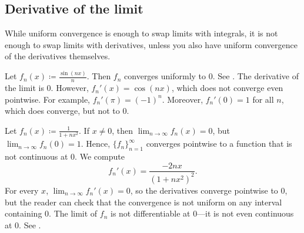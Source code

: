 \subsection{Derivative of the limit}

While uniform convergence is enough to swap limits with integrals, it is not
enough to swap limits with derivatives, unless you also have
uniform convergence of the derivatives themselves.

\begin{example}
Let $f_n(x) \coloneqq \frac{\sin(nx)}{n}$.  Then $f_n$ converges uniformly to
0.  See .
The derivative of the limit is 0.  However, $f_n'(x) = \cos(nx)$, which
does not converge even pointwise.
For example, $f_n'(\pi) = {(-1)}^n$.
Moreover, $f_n'(0) = 1$ for all $n$, which does converge, but not to $0$.
\begin{myfigureht}
\caption{Graphs of $\frac{\sin(nx)}{n}$ for
$n=1,2,\ldots,10$, with higher $n$ in fainter gray.%
\label{fig:conv1nsinxn}}
\end{myfigureht}
\end{example}

\begin{example} \label{exercise:badconvergenceder}
Let $f_n(x) \coloneqq \frac{1}{1+nx^2}$.
If $x \neq 0$, then $\lim_{n \to \infty} f_n(x) = 0$,
but $\lim_{n \to \infty} f_n(0) = 1$.
Hence, $\{ f_n \}_{n=1}^\infty$ converges pointwise to a function that is not continuous
at $0$.
We compute
\begin{equation*}
f_n'(x) %
= \frac{-2 n x}{(1+ n x^2)^2} .
\end{equation*}
For every $x$, $\lim_{n\to\infty} f_n'(x) = 0$, so the derivatives
converge pointwise to 0,
but the reader can check that the convergence is not uniform on any
interval containing $0$.
The limit of $f_n$ is not differentiable at $0$---it is not even
continuous at $0$.  See .
\begin{myfigureht}
\caption{Graphs of $\frac{1}{1+nx^2}$ and its derivative
for $n=1,2,\ldots,10$, with higher $n$ in fainter gray.%
\label{fig:convder1over1pnxsq}}
\end{myfigureht}
\end{example}

